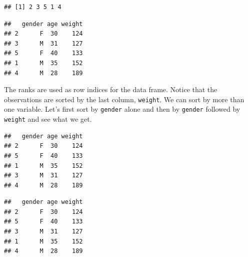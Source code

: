 \documentclass[
]{book}
\newenvironment{Shaded}{\begin{snugshade}}{\end{snugshade}}
\newcommand{\KeywordTok}[1]{\textcolor[rgb]{0.13,0.29,0.53}{\textbf{#1}}}
\newcommand{\NormalTok}[1]{#1}
\newcommand{\OperatorTok}[1]{\textcolor[rgb]{0.81,0.36,0.00}{\textbf{#1}}}
\begin{document}
\begin{Shaded}
\end{Shaded}

\begin{verbatim}
## [1] 2 3 5 1 4
\end{verbatim}

\begin{Shaded}
\end{Shaded}

\begin{verbatim}
##   gender age weight
## 2      F  30    124
## 3      M  31    127
## 5      F  40    133
## 1      M  35    152
## 4      M  28    189
\end{verbatim}

The ranks are used as row indices for the data frame. Notice that the observations are sorted by the last column, \texttt{weight}. We can sort by more than one variable. Let's first sort by \texttt{gender} alone and then by \texttt{gender} followed by \texttt{weight} and see what we get.

\begin{Shaded}
\end{Shaded}

\begin{verbatim}
##   gender age weight
## 2      F  30    124
## 5      F  40    133
## 1      M  35    152
## 3      M  31    127
## 4      M  28    189
\end{verbatim}

\begin{Shaded}
\end{Shaded}

\begin{verbatim}
##   gender age weight
## 2      F  30    124
## 5      F  40    133
## 3      M  31    127
## 1      M  35    152
## 4      M  28    189
\end{verbatim}
\end{document}
